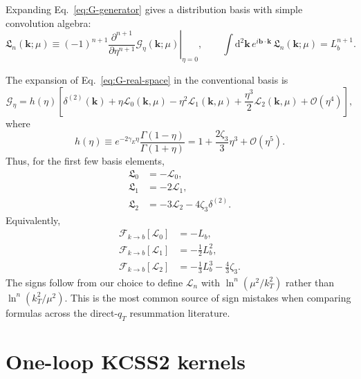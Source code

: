 \documentclass[11pt]{article}
\newcommand{\bk}{\bm{k}}
\newcommand{\bb}{\bm{b}}
\newcommand{\dd}{\mathrm{d}}
\newcommand{\muR}{\mu}
\newcommand{\deltaT}{\delta^{(2)}}
\newcommand{\order}[1]{\mathcal{O}\!\left(#1\right)}
\begin{document}
Expanding Eq.~\eqref{eq:G-generator} gives a distribution basis with simple convolution
algebra:
\begin{equation}
  \mathfrak L_n(\bk;\muR)
  \equiv
  (-1)^{n+1}
  \left.
  \frac{\partial^{n+1}}{\partial\eta^{n+1}}\mathcal G_\eta(\bk;\muR)
  \right|_{\eta=0},
  \qquad
  \int \dd^2\bk\, e^{i\bb\cdot\bk}\,\mathfrak L_n(\bk;\muR)=L_b^{n+1}.
  \label{eq:frakL}
\end{equation}

The expansion of Eq.~\eqref{eq:G-real-space} in the conventional basis is
\begin{equation}
  \mathcal G_\eta
  =
  h(\eta)
  \left[
    \deltaT(\bk)
    +\eta\mathcal L_0(\bk,\muR)
    -\eta^2\mathcal L_1(\bk,\muR)
    +\frac{\eta^3}{2}\mathcal L_2(\bk,\muR)
    +\order{\eta^4}
  \right],
  \label{eq:G-expanded-Ln}
\end{equation}
where
\begin{equation}
  h(\eta)
  \equiv e^{-2\gamma_E\eta}\frac{\Gamma(1-\eta)}{\Gamma(1+\eta)}
  =1+\frac{2\zeta_3}{3}\eta^3+\order{\eta^5}.
  \label{eq:h-eta}
\end{equation}
Thus, for the first few basis elements,
\begin{align}
  \mathfrak L_0 &= -\mathcal L_0,
  \label{eq:frakL0-L0}\\
  \mathfrak L_1 &= -2\mathcal L_1,
  \label{eq:frakL1-L1}\\
  \mathfrak L_2 &= -3\mathcal L_2-4\zeta_3\deltaT.
  \label{eq:frakL2-L2}
\end{align}
Equivalently,
\begin{align}
  \mathcal F_{k\to b}[\mathcal L_0] &= -L_b,
  \\
  \mathcal F_{k\to b}[\mathcal L_1] &= -\frac{1}{2}L_b^2,
  \\
  \mathcal F_{k\to b}[\mathcal L_2] &= -\frac{1}{3}L_b^3-\frac{4}{3}\zeta_3.
\end{align}
The signs follow from our choice to define $\mathcal L_n$ with
$\ln^n(\mu^2/k_T^2)$ rather than $\ln^n(k_T^2/\mu^2)$. This is the most common
source of sign mistakes when comparing formulas across the direct-$q_T$ resummation
literature.


\section{One-loop KCSS2 kernels}
\label{sec:one-loop-kcss}
\end{document}
